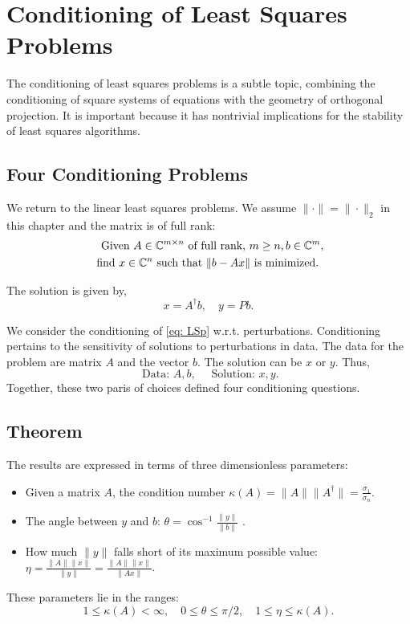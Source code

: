 \chapter{Conditioning of Least Squares Problems} 
The conditioning of least squares problems is a subtle topic, combining the conditioning of square systems of equations with the geometry of orthogonal projection. It is important because it has nontrivial implications for the stability of least squares algorithms.

\section{Four Conditioning Problems}
We return to the linear least squares problems. We assume $\|\cdot \| = \|\cdot \|_2$ in this chapter and the matrix is of full rank: 
\begin{align}
    \label{eq: LSp} 
    \text{ Given } A\in \mathbb{C}^{m\times n} \text{ of full rank, } m\ge n, b\in \mathbb{C}^m, \\ 
    \text{ find } x\in \mathbb{C}^n \text{ such that } \|b-Ax\| \text{ is minimized. } \notag 
\end{align}

The solution is given by, 
\begin{equation}
    \label{eq: solu of LS} 
    x = A^\dagger b, \quad y = Pb. 
\end{equation}

We consider the conditioning of \eqref{eq: LSp} w.r.t. perturbations. Conditioning pertains to the sensitivity of solutions to perturbations in data. The data for the problem are matrix $A$ and the vector $b$. The solution can be $x$ or $y$. Thus, 
\[
    \text{ Data: }A,b, \quad \text{ Solution: } x,y. 
\]
Together, these two paris of choices defined four conditioning questions. 

\section{Theorem}
The results are expressed in terms of three dimensionless parameters: 
\begin{itemize}
    \item Given a matrix $A$, the condition number $\kappa(A) = \|A\| \|A^\dagger\| = \frac{\sigma_1}{\sigma_n}.$ 
    \item The angle between $y$ and $b$: $ \theta  = \cos^{-1} \frac{\|y\|}{\|b\|} $ . 
    \item How much $\|y\|$ falls short of its maximum possible value:  $\eta = \frac{\|A\| \|x\|}{\|y\|} = \frac{\|A\| \|x\|}{\|Ax\|}$. 
\end{itemize}
These parameters lie in the ranges: 
\[
    1 \leq \kappa(A)<\infty, \quad 0 \leq \theta \leq \pi / 2, \quad 1 \leq \eta \leq \kappa(A). 
\]


